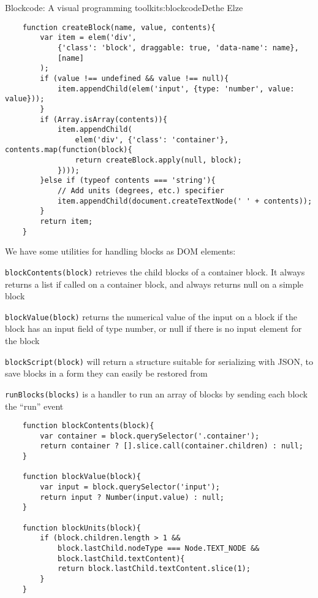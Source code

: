 \begin{aosachapter}{Blockcode: A visual programming toolkit}{s:blockcode}{Dethe Elze}
\begin{verbatim}
    function createBlock(name, value, contents){
        var item = elem('div', 
            {'class': 'block', draggable: true, 'data-name': name}, 
            [name]
        );
        if (value !== undefined && value !== null){
            item.appendChild(elem('input', {type: 'number', value: value}));
        }
        if (Array.isArray(contents)){
            item.appendChild(
                elem('div', {'class': 'container'}, contents.map(function(block){
                return createBlock.apply(null, block);
            })));
        }else if (typeof contents === 'string'){ 
            // Add units (degrees, etc.) specifier
            item.appendChild(document.createTextNode(' ' + contents));
        }
        return item;
    }
\end{verbatim}

We have some utilities for handling blocks as DOM elements:

\begin{aosaitemize}

\item
  \texttt{blockContents(block)} retrieves the child blocks of a
  container block. It always returns a list if called on a container
  block, and always returns null on a simple block
\item
  \texttt{blockValue(block)} returns the numerical value of the input on
  a block if the block has an input field of type number, or null if
  there is no input element for the block
\item
  \texttt{blockScript(block)} will return a structure suitable for
  serializing with JSON, to save blocks in a form they can easily be
  restored from
\item
  \texttt{runBlocks(blocks)} is a handler to run an array of blocks by
  sending each block the ``run'' event
\end{aosaitemize}

\begin{verbatim}
    function blockContents(block){
        var container = block.querySelector('.container');
        return container ? [].slice.call(container.children) : null;
    }

    function blockValue(block){
        var input = block.querySelector('input');
        return input ? Number(input.value) : null;
    }

    function blockUnits(block){
        if (block.children.length > 1 && 
            block.lastChild.nodeType === Node.TEXT_NODE && 
            block.lastChild.textContent){
            return block.lastChild.textContent.slice(1);
        }
    }


\end{verbatim}
\end{aosachapter}
